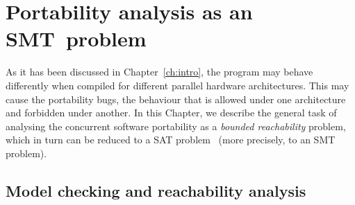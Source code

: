 \chapter{Portability analysis as an SMT~problem}%
\label{ch:port}



As it has been discussed in Chapter~\ref{ch:intro}, the program may behave differently when compiled for different parallel hardware architectures. This may cause the portability bugs, the behaviour that is allowed under one architecture and forbidden under another. 
In this Chapter, we describe the general task of analysing the concurrent software portability
as a \textit{bounded reachability} problem, which in turn can be reduced to a SAT problem~\cite{Porthos17SAS} (more precisely, to an SMT problem).


\section{Model checking and reachability analysis}
\label{ch:port:mc}


